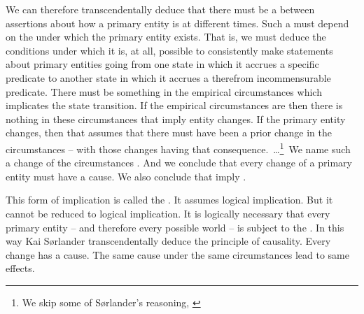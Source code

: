 \mnewfoil

\begynd
\pind We can therefore transcendentally deduce that \nyl
      there must be a  \nyl between assertions about how a primary entity
    \nyl is at different times.
\begynd
\pind Such a  must depend on
      the  under which the primary entity
      exists. 
\pind That is, we must deduce the conditions under which it is, at
      all, possible to consistently make statements about primary
      entities going from one state in which it accrues a specific
      predicate to another state in which it accrues a therefrom
      incommensurable predicate.
\pind There must be something in the empirical circumstances which
      implicates the state transition.
\mnewfoil
\pind If the  empirical circumstances are  \nyl
      then there is nothing in these circumstances that imply entity changes.
\pind If the primary entity changes, then that assumes that there must
      have been a prior change in the circumstances -- with those
      changes having that consequence.\ \ldots\footnote{We skip some of
      S{\o}rlander's reasoning, \cite[Page\,162, lines 1--12]{kaisorlander2016}}\ 
\pind We name such a change of the circumstances .
\pind And we conclude that every change of a primary entity must have
      a cause.
\pind We also conclude that  imply
      .
\afslut
\afslut

\mnewfoil

\begynd
\pind This form of implication is called the . \index{pconind}{principle!of
      causality}%
\begynd 
\pind It assumes logical implication.
\pind But it cannot be reduced to logical implication. 
\pind It is logically necessary that every primary entity -- and
      therefore every possible world -- is subject
      to the .
\afslut
\pind In this way Kai S{\o}rlander transcendentally deduce the
      principle of causality.
\pind Every change has a cause.
\pind The same cause under the same circumstances lead to same effects.
\afslut


